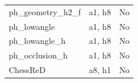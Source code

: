 \begin{longtable}{>{\raggedright\arraybackslash}p{.47\linewidth}>{\raggedright\arraybackslash}p{.25\linewidth}l}
ph\_\allowbreak{}geometry\_\allowbreak{}h2\_\allowbreak{}f & %
a1, h8 & %
No \\ %

ph\_\allowbreak{}lowangle & %
a1, h8 & %
No \\ %

ph\_\allowbreak{}lowangle\_\allowbreak{}h & %
a1, h8 & %
No \\ %

ph\_\allowbreak{}occlusion\_\allowbreak{}h & %
a1, h8 & %
No \\ %

ChessReD & %
a8, h1 & %
No \\ %


\end{longtable}
